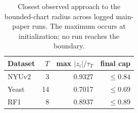 \begin{table}[t]
\centering
\caption{Closest observed approach to the bounded-chart radius across logged main-paper runs. The maximum occurs at initialization; no run reaches the boundary.}
\label{tab:saturation}
\small
\begin{tabular}{lrrr}
\toprule
Dataset & $T$ & max $|z_i|/\tau_T$ & final cap \\
\midrule
NYUv2 & 3 & 0.9327 & $\leq 0.84$ \\
Yeast & 14 & 0.7017 & $\leq 0.69$ \\
RF1 & 8 & 0.8937 & $\leq 0.89$ \\
\bottomrule
\end{tabular}
\end{table}
